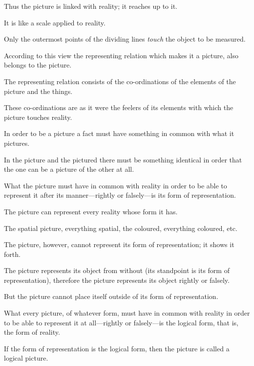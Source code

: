 {Thus the picture is linked with reality; it reaches
up to it.}


{It is like a scale applied to reality.}


{Only the outermost points of the dividing lines
\emph{touch} the object to be measured.}


{According to this view the representing relation
which makes it a picture, also belongs to the
picture.}


{The representing relation consists of the co-ordinations
of the elements of the picture and the
things.}


{These co-ordinations are as it were the feelers of
its elements with which the picture touches
reality.}


{In order to be a picture a fact must have something
in common with what it pictures.}


{In the picture and the pictured there must be
something identical in order that the one can be a
picture of the other at all.}


{What the picture must have in common with
reality in order to be able to represent it after its
manner---rightly or falsely---is its form of representation.}


{The picture can represent every reality whose
form it has.

The spatial picture, everything spatial, the
coloured, everything coloured, etc.}


{The picture, however, cannot represent its form
of representation; it shows it forth.}


{The picture represents its object from without
(its standpoint is its form of representation), therefore
the picture represents its object rightly or
falsely.}


{But the picture cannot place itself outside of its
form of representation.}


{What every picture, of whatever form, must
have in common with reality in order to be able to
represent it at all---rightly or falsely---is the logical
form, that is, the form of reality.}


{If the form of representation is the logical form,
then the picture is called a logical picture.}


